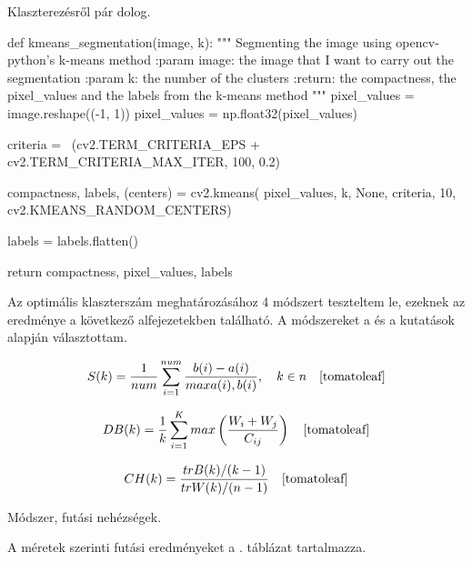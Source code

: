 
Klaszterezésről pár dolog. \cite{clustering}


\begin{python}
def kmeans_segmentation(image, k):
    """
    Segmenting the image using opencv-python's k-means method
    :param image: the image that I want to carry out the segmentation
    :param k: the number of the clusters
    :return: the compactness, the pixel_values and the labels
        from the k-means method
    """
    pixel_values = image.reshape((-1, 1))
    pixel_values = np.float32(pixel_values)

    criteria = \
        (cv2.TERM_CRITERIA_EPS + cv2.TERM_CRITERIA_MAX_ITER, 100, 0.2)

    compactness, labels, (centers) = cv2.kmeans(
        pixel_values,
        k,
        None,
        criteria,
        10,
        cv2.KMEANS_RANDOM_CENTERS)

    labels = labels.flatten()

    return compactness, pixel_values, labels
\end{python}


Az optimális klaszterszám meghatározásához 4 módszert teszteltem le, ezeknek az eredménye a következő alfejezetekben található.
A módszereket a \cite{tomatoleaf} és a \cite{elbow} kutatások alapján választottam.


\[ S(k)=\frac{1}{num} \sum_{i=1}^{num} \frac{b(i)-a(i)}{maxa(i),b(i)}, \quad k \in n  \quad \cite{tomatoleaf} \]


\[ DB(k)=\frac{1}{k} \sum_{i=1}^{K} max \left(\frac{W_i + W_j}{C_{ij}}\right)  \quad \cite{tomatoleaf} \]


\[ CH(k)=\frac{trB(k)/(k-1)}{trW(k)/(n-1)} \quad \cite{tomatoleaf}\]


Módszer, futási nehézségek.


A méretek szerinti futási eredményeket a . táblázat tartalmazza.

